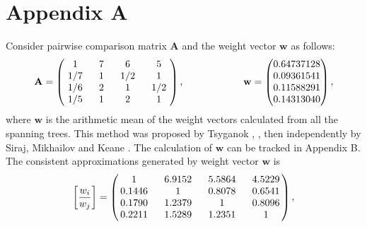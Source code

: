 \documentclass{article}
\theoremstyle{plain}
\begin{document}
\section*{Appendix A} \label{section:AppendixA} %

Consider pairwise comparison matrix $\mathbf{A}$ and the weight vector ${\mathbf{w}}$ as follows:
\[
\mathbf{A} =
\begin{pmatrix}
$\,\,$   1  $\,\,$   & $\,\,$    7  $\,\,$   & $\,\,$    6   $\,\,$ & $\,\,$    5   $\,\,$     \\
$\,\,$  1/7 $\,\,$   & $\,\,$    1  $\,\,$   & $\,\,$   1/2  $\,\,$ & $\,\,$    1   $\,\,$     \\
$\,\,$  1/6 $\,\,$   & $\,\,$    2  $\,\,$   & $\,\,$    1   $\,\,$ & $\,\,$   1/2  $\,\,$     \\
$\,\,$  1/5 $\,\,$   & $\,\,$    1  $\,\,$   & $\,\,$    2   $\,\,$ & $\,\,$    1   $\,\,$
\end{pmatrix},
\qquad
\qquad
\qquad
{\mathbf{w}} =
\begin{pmatrix}
0.64737128  \\
0.09361541 \\
0.11588291  \\
0.14313040
\end{pmatrix},
\]
where ${\mathbf{w}}$ is the arithmetic mean of the weight vectors calculated from all the spanning trees. This method was
proposed by Tsyganok \cite{Tsyganok2000}, \cite[Section 3.5 Combinatorial method]{Tsyganok2010}, then independently
by Siraj, Mikhailov and Keane \cite{SirajMikhailovKeane2012a,SirajMikhailovKeane2012b}.
The calculation of ${\mathbf{w}}$ can be tracked in Appendix B. \\

The consistent approximations generated by weight vector ${\mathbf{w}}$ is
\[
\left[ \frac{{w}_i}{{w}_j} \right] =
\begin{pmatrix}
$\,$    1   $\,\,$ & $\,\,$ 6.9152 $\,\,$ & $\,\,$ 5.5864 $\,\,$ & $\,\,$ 4.5229 $\,$    \\
$\,$ 0.1446 $\,\,$ & $\,\,$   1    $\,\,$ & $\,\,$ 0.8078 $\,\,$ & $\,\,$ 0.6541 $\,$    \\
$\,$ 0.1790 $\,\,$ & $\,\,$ 1.2379 $\,\,$ & $\,\,$   1    $\,\,$ & $\,\,$ 0.8096 $\,$   \\
$\,$ 0.2211 $\,\,$ & $\,\,$ 1.5289 $\,\,$ & $\,\,$ 1.2351 $\,\,$ & $\,\,$   1    $\,$
\end{pmatrix},
\]
\end{document}
